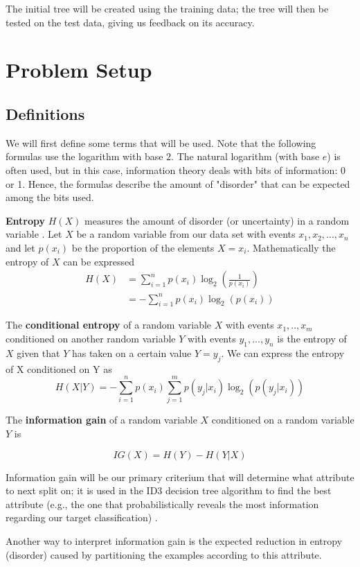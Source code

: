 \documentclass{article}
\begin{document}
The initial tree will be created using the training data; the tree will then be tested on the test data, giving us feedback on its accuracy.

\section{Problem Setup}

\subsection{Definitions}

We will first define some terms that will be used. Note that the following formulas use the logarithm with base $2$. The natural logarithm (with base $e$) is often used, but in this case, information theory deals with bits of information: 0 or 1. Hence, the formulas describe the amount of "disorder" that can be expected among the bits used.

\textbf{Entropy} $H(X)$ measures the amount of disorder (or uncertainty) in a random variable \cite{segaran2007}. Let $X$ be a random variable from our data set with events ${x_1, x_2,...,x_n}$ and let $p(x_i)$ be the proportion of the elements $X = x_i$.  Mathematically the entropy of $X$ can be expressed  
\begin{align*}
 H(X) &= \sum_{i=1}^{n} p(x_i)\log_{2}\left(\frac{1}{p(x_i)}\right) \\
&= -\sum_{i=1}^{n}p(x_i)\log_{2}\left(p(x_i)\right)
\end{align*}

The \textbf{conditional entropy} of a random variable $X$ with events ${x_1,..,x_m}$ conditioned on another random variable $Y$ with events ${y_1,...,y_n}$ is the entropy of $X$ given that $Y$ has taken on a certain value $Y=y_j$. We can express the entropy of X conditioned on Y as
$$ H(X|Y) = -\sum_{i=1}^{n}p(x_i)\sum_{j=1}^{m}p(y_j|x_i)\log_2\left(p(y_j|x_i)\right) $$

The \textbf{information gain} of a random variable $X$ conditioned on a random variable $Y$ is

$$ IG(X) = H(Y) - H(Y|X) $$

Information gain will be our primary criterium that will determine what attribute to next split on; it is used in the ID3 decision tree algorithm to find the best attribute (e.g., the one that probabilistically reveals the most information regarding our target classification) \cite{mitchell1997}.

Another way to interpret information gain is the expected reduction in entropy (disorder) caused by partitioning the examples according to this attribute.
\end{document}
